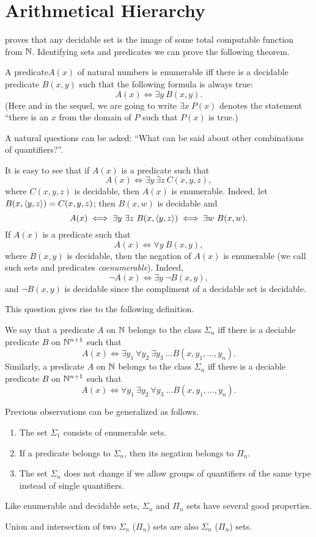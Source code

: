 \chapter{Arithmetical Hierarchy}

 proves that any decidable set
is the image of some total computable function from ${\mathbb{N}}$. Identifying sets and
predicates we can prove the following theorem.
\begin{theorem}
  A predicate$A(x)$ of natural numbers is enumerable iff there is a decidable
  predicate $B(x, y)$ such that the following formula is always true:
  \[
    A(x) \iff \exists y \  B(x, y).
  \]
  (Here and in the sequel, we are going to write $\exists x \  P(x)$ denotes the
  statement ``there is an $x$ from the domain of $P$ such that $P(x)$ is true.)
\end{theorem}

A natural questions can be asked: ``What can be said about other combinations of
quantifiers?''.

It is easy to see that if $A(x)$ is a predicate such that 
\[
  A(x) \iff \exists y \  \exists z \  C(x, y, z),
\]
where $C(x, y, z)$ is decidable, then $A(x)$ is enumerable.
Indeed, let $B(x, \langle {y}, {z} \rangle) = C(x, y, z)$; then $B(x, w)$ is decidable and 
\[
  A(x) \iff \exists y \  \exists z \  B(x, \langle {y}, {z} \rangle) \iff 
    \exists w \  B(x, w).
\]
If $A(x)$ is a predicate such that 
\[
  A(x) \iff \forall y \  B(x, y),
\]
where $B(x, y)$ is decidable, then the negation of $A(x)$ is enumerable (we call
such sets and predicates \emph{coenumerable}). Indeed, 
\[
  \lnot A(x) \iff \exists y \  \lnot B(x, y),
\]
and $\lnot B(x, y)$ is decidable since the compliment of a decidable set is
decidable.

This question gives rise to the following definition.
\begin{definition}
  We say that a predicate $A$ on ${\mathbb{N}}$ belongs to the class $\Sigma_n$ iff there
  is a deciable predicate $B$ on ${\mathbb{N}}^{n + 1}$ such that 
  \[
    A(x) \iff 
    \exists y_1 \  \forall y_2 \  \exists y_3 \  \dots B(x, y_1, \dots, y_n).
  \]
  Similarly, a predicate $A$ on ${\mathbb{N}}$ belongs to the class $\Sigma_n$ iff there
  is a deciable predicate $B$ on ${\mathbb{N}}^{n + 1}$ such that 
  \[
    A(x) \iff 
    \forall y_1 \  \exists y_2 \  \forall y_3 \  \dots B(x, y_1, \dots, y_n).
  \]
\end{definition}

Previous observations can be generalized as follows.
\begin{theorem}
  \begin{enumerate}
    \item The set $\Sigma_1$ consists of enumerable sets.
    \item If a predicate belongs to $\Sigma_n$, then its negation belongs to
      $\Pi_n$.
    \item The set $\Sigma_n$ does not change if we allow groups of quantifiers
      of the same type instead of single quantifiers.
  \end{enumerate}
\end{theorem}

Like enumerable and decidable sets, $\Sigma_n$ and $\Pi_n$ sets have several
good properties.
\begin{theorem}
  Union and intersection of two $\Sigma_n$ ($\Pi_n$) sets are also $\Sigma_n$
  ($\Pi_n$) sets.
\end{theorem}

